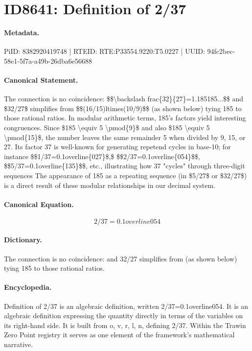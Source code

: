 \section*{ID8641: Definition of 2/37}
\paragraph{Metadata.}
PiID: 8382920419748 | RTEID: RTE:P33554.9220:T5.0227 | UUID: 94fc2bec-58e1-5f7a-a49b-26dba6e56688

\paragraph{Canonical Statement.}
The connection is no coincidence: \$\$\textbackslash{}backslash frac\{32\}\{27\}=1.185185...\$\$ and \$32/27\$ simplifies from \$\$(16/15)ltimes(10/9)\$\$ (as shown below) tying 185 to those rational ratios. In modular arithmetic terms, 185's factors yield interesting congruences. Since \$185 \textbackslash{}equiv 5 \textbackslash{}pmod\{9\}\$ and also \$185 \textbackslash{}equiv 5 \textbackslash{}pmod\{15\}\$, the number leaves the same remainder 5 when divided by 9, 15, or 27. Its factor 37 is well-known for generating repetend cycles in base-10; for instance \$\$1/37=0.1overline\{027\}\$,\$ \$\$2/37=0.1overline\{054\}\$\$, \$\$5/37=0.1overline\{135\}\$\$, etc., illustrating how 37 "cycles" through three-digit sequences The appearance of 185 as a repeating sequence (in \$5/27\$ or \$32/27\$) is a direct result of these modular relationships in our decimal system.

\paragraph{Canonical Equation.}
\[
2/37=0.1overline{054}
\]

\paragraph{Dictionary.}
The connection is no coincidence: and 32/27 simplifies from (as shown below) tying 185 to those rational ratios.

\paragraph{Encyclopedia.}
Definition of 2/37 is an algebraic definition, written 2/37=0.1overline054. It is an algebraic definition expressing the quantity directly in terms of the variables on its right-hand side. It is built from o, v, r, l, n, defining 2/37. Within the Trawin Zero Point registry it serves as one element of the framework's mathematical narrative.
